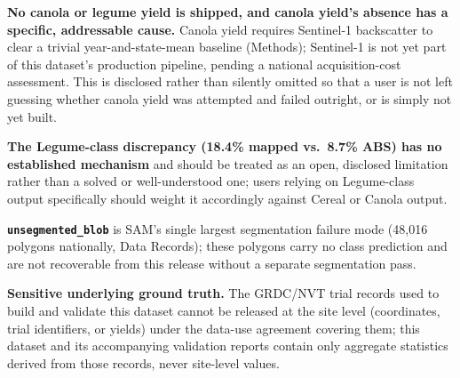 \textbf{No canola or legume yield is shipped, and canola yield's absence has a specific, addressable cause.} Canola yield requires Sentinel-1 backscatter to clear a trivial year-and-state-mean baseline (Methods); Sentinel-1 is not yet part of this dataset's production pipeline, pending a national acquisition-cost assessment. This is disclosed rather than silently omitted so that a user is not left guessing whether canola yield was attempted and failed outright, or is simply not yet built.

\textbf{The Legume-class discrepancy (18.4\% mapped vs.~8.7\% ABS) has no established mechanism} and should be treated as an open, disclosed limitation rather than a solved or well-understood one; users relying on Legume-class output specifically should weight it accordingly against Cereal or Canola output.

\textbf{\texttt{unsegmented\_blob}} is SAM's single largest segmentation failure mode (48,016 polygons nationally, Data Records); these polygons carry no class prediction and are not recoverable from this release without a separate segmentation pass.

\textbf{Sensitive underlying ground truth.} The GRDC/NVT trial records used to build and validate this dataset cannot be released at the site level (coordinates, trial identifiers, or yields) under the data-use agreement covering them; this dataset and its accompanying validation reports contain only aggregate statistics derived from those records, never site-level values.
